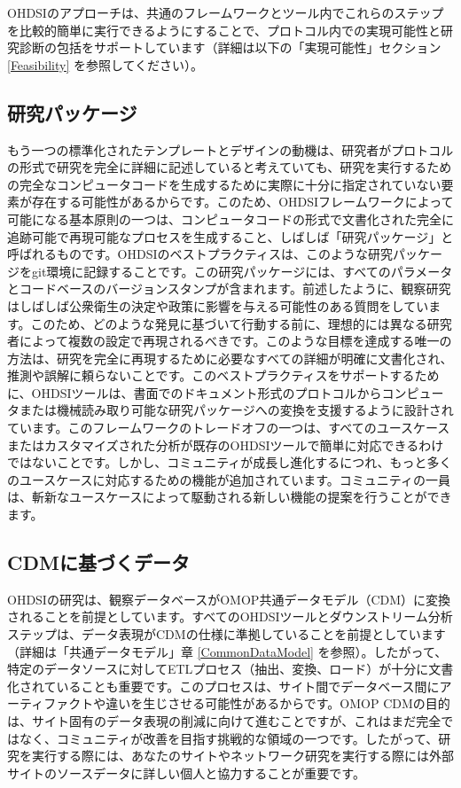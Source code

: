 \documentclass[
  11pt]{book}
\theoremstyle{definition}
\theoremstyle{definition}
\theoremstyle{definition}
\theoremstyle{definition}
\theoremstyle{remark}
\begin{document}
OHDSIのアプローチは、共通のフレームワークとツール内でこれらのステップを比較的簡単に実行できるようにすることで、プロトコル内での実現可能性と研究診断の包括をサポートしています（詳細は以下の「実現可能性」セクション \ref{Feasibility} を参照してください）。

\subsection{研究パッケージ}\label{ux7814ux7a76ux30d1ux30c3ux30b1ux30fcux30b8}


もう一つの標準化されたテンプレートとデザインの動機は、研究者がプロトコルの形式で研究を完全に詳細に記述していると考えていても、研究を実行するための完全なコンピュータコードを生成するために実際に十分に指定されていない要素が存在する可能性があるからです。このため、OHDSIフレームワークによって可能になる基本原則の一つは、コンピュータコードの形式で文書化された完全に追跡可能で再現可能なプロセスを生成すること、しばしば「研究パッケージ」と呼ばれるものです。OHDSIのベストプラクティスは、このような研究パッケージをgit環境に記録することです。この研究パッケージには、すべてのパラメータとコードベースのバージョンスタンプが含まれます。前述したように、観察研究はしばしば公衆衛生の決定や政策に影響を与える可能性のある質問をしています。このため、どのような発見に基づいて行動する前に、理想的には異なる研究者によって複数の設定で再現されるべきです。このような目標を達成する唯一の方法は、研究を完全に再現するために必要なすべての詳細が明確に文書化され、推測や誤解に頼らないことです。このベストプラクティスをサポートするために、OHDSIツールは、書面でのドキュメント形式のプロトコルからコンピュータまたは機械読み取り可能な研究パッケージへの変換を支援するように設計されています。このフレームワークのトレードオフの一つは、すべてのユースケースまたはカスタマイズされた分析が既存のOHDSIツールで簡単に対応できるわけではないことです。しかし、コミュニティが成長し進化するにつれ、もっと多くのユースケースに対応するための機能が追加されています。コミュニティの一員は、斬新なユースケースによって駆動される新しい機能の提案を行うことができます。

\subsection{CDMに基づくデータ}\label{cdmux306bux57faux3065ux304fux30c7ux30fcux30bf}

OHDSIの研究は、観察データベースがOMOP共通データモデル（CDM）に変換されることを前提としています。すべてのOHDSIツールとダウンストリーム分析ステップは、データ表現がCDMの仕様に準拠していることを前提としています（詳細は「共通データモデル」章 \ref{CommonDataModel} を参照）。したがって、特定のデータソースに対してETLプロセス（抽出、変換、ロード）が十分に文書化されていることも重要です。このプロセスは、サイト間でデータベース間にアーティファクトや違いを生じさせる可能性があるからです。OMOP CDMの目的は、サイト固有のデータ表現の削減に向けて進むことですが、これはまだ完全ではなく、コミュニティが改善を目指す挑戦的な領域の一つです。したがって、研究を実行する際には、あなたのサイトやネットワーク研究を実行する際には外部サイトのソースデータに詳しい個人と協力することが重要です。
\end{document}

